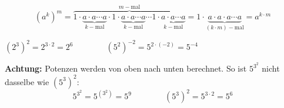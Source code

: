 \[
  (a^{k})^{m} = \overbrace{1\cdot\underbrace{a\cdot a\cdots a}_{k-\text{mal}}\cdot 1\cdot\underbrace{a\cdot a\cdots a}_{k-\text{mal}}\cdots 1\cdot\underbrace{a\cdot a\cdots a}_{k-\text{mal}}}^{m-\text{mal}} = 1\cdot\underbrace{a\cdot a\cdot a\cdots a}_{(k\cdot m)-\text{mal}} = a^{k\cdot m}
\]
\begin{example}
  $\displaystyle (2^{3})^{2} = 2^{3\cdot 2} = 2^{6} \qquad\qquad (5^{2})^{-2} = 5^{2\cdot(-2)} = 5^{-4}$
\end{example}
\begin{note}
  \textbf{Achtung:} Potenzen werden von oben nach unten berechnet. So ist $5^{3^{2}}$ nicht dasselbe wie $\left(5^{3}\right)^{2}$:
  \[
    5^{3^{2}} = 5^{\left(3^{2}\right)} = 5^{9} \qquad\qquad \left(5^{3}\right)^{2} = 5^{3\cdot 2} = 5^{6}
  \]
\end{note}
